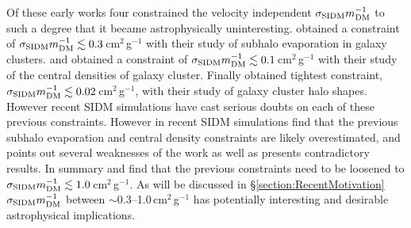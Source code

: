 Of these early works four constrained the velocity independent $\sigma_{\rm SIDM}m_{\rm DM}^{-1}$ to such a degree that it became astrophysically uninteresting.
\citet{Gnedin:2001gd} obtained a constraint of $\sigma_{\rm SIDM}m_{\rm DM}^{-1}\lesssim 0.3$\,cm$^2$\,g$^{-1}$ with their study of subhalo evaporation in galaxy clusters.
\citet{Yoshida:2000gn} and \citet{Meneghetti:2001en} obtained a constraint of $\sigma_{\rm SIDM}m_{\rm DM}^{-1}\lesssim 0.1$\,cm$^2$\,g$^{-1}$ with their study of the central densities of galaxy cluster.
Finally \citet{MiraldaEscude:2002ev} obtained tightest constraint, $\sigma_{\rm SIDM}m_{\rm DM}^{-1}\lesssim 0.02$\,cm$^2$\,g$^{-1}$, with their study of galaxy cluster halo shapes.
However recent SIDM simulations \citep{Peter:2012vi, Rocha:2012tr} have cast serious doubts on each of these previous constraints.
However in recent SIDM simulations\citet{Rocha:2012tr} find that the previous subhalo evaporation and central density constraints are likely overestimated, and \citet{Peter:2012vi} points out several weaknesses of the \citet{MiraldaEscude:2002ev} work as well as presents contradictory results.
In summary \citet{Peter:2012vi} and \citet{Rocha:2012tr} find that the previous constraints need to be loosened to $\sigma_{\rm SIDM}m_{\rm DM}^{-1}\lesssim 1.0$\,cm$^2$\,g$^{-1}$.
As will be discussed in \S\ref{section:RecentMotivation}  $\sigma_{\rm SIDM}m_{\rm DM}^{-1}$ between $\sim$0.3--1.0\,cm$^2$\,g$^{-1}$ has potentially interesting and desirable astrophysical implications.

